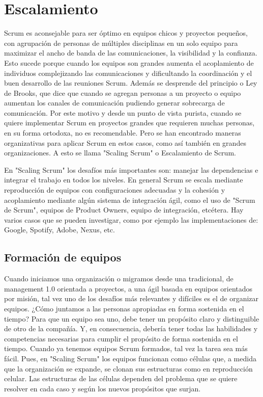 \chapter{Escalamiento}

Scrum es aconsejable para ser óptimo en equipos chicos y proyectos pequeños, con agrupación de personas de múltiples disciplinas en un solo equipo para maximizar el ancho de banda de las comunicaciones, la visibilidad y la confianza. Esto sucede porque cuando los equipos son grandes aumenta el acoplamiento de individuos complejizando las comunicaciones y dificultando la coordinación y el buen desarrollo de las reuniones Scrum. Además se desprende del principio o Ley de Brooks, que dice que cuando se agregan personas a un proyecto o equipo aumentan los canales de comunicación pudiendo generar sobrecarga de comunicación. Por este motivo y desde un punto de vista purista, cuando se quiere implementar Scrum en proyectos grandes que requieren muchas personas, en su forma ortodoxa, no es recomendable. Pero se han encontrado maneras organizativas para aplicar Scrum en estos casos, como así también en grandes organizaciones. A esto se llama "Scaling Scrum" o Escalamiento de Scrum.

En "Scaling Scrum" los desafíos más importantes son: manejar las dependencias e integrar el trabajo en todos los niveles. En general Scrum se escala mediante reproducción de equipos con configuraciones adecuadas y la cohesión y acoplamiento mediante algún sistema de integración ágil, como el uso de "Scrum de Scrum", equipos de Product Owners, equipo de integración, etcétera. Hay varios casos que se pueden investigar, como por ejemplo las implementaciones de: Google, Spotify, Adobe, Nexus, etc.

\section{Formación de equipos}

Cuando iniciamos una organización o migramos desde una tradicional, de management 1.0 orientada a proyectos, a una ágil basada en equipos orientados por misión, tal vez uno de los desafíos más relevantes y difíciles es el de organizar equipos. ¿Cómo juntamos a las personas apropiadas en forma sostenida en el tiempo? Para que un equipo sea uno, debe tener un propósito claro y distinguible de otro de la compañía. Y, en consecuencia, debería tener todas las habilidades y competencias necesarias para cumplir el propósito de forma sostenida en el tiempo. Cuando ya tenemos equipos Scrum formados, tal vez la tarea sea más fácil. Pues, en "Scaling Scrum" los equipos funcionan como células que, a medida que la organización se expande, se clonan sus estructuras como en reproducción celular. Las estructuras de las células dependen del problema que se quiere resolver en cada caso y según los nuevos propósitos que surjan. 

